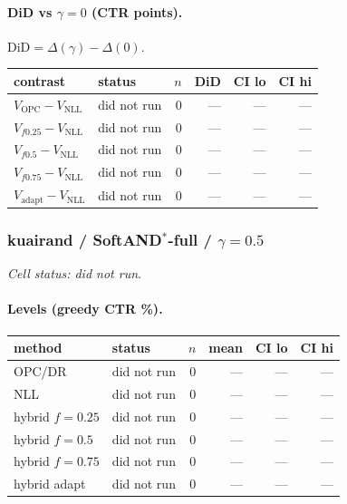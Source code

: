 \documentclass[10pt,a4paper]{article}
\begin{document}
\paragraph{DiD vs $\gamma=0$ (CTR points).} $\mathrm{DiD}=\Delta(\gamma)-\Delta(0)$.
{\centering\small\begin{tabular}{llrrrr}
\toprule contrast & status & $n$ & DiD & CI lo & CI hi \\
\midrule
$V_{\mathrm{OPC}}-V_{\mathrm{NLL}}$ & did not run & 0 & --- & --- & --- \\
$V_{f0.25}-V_{\mathrm{NLL}}$ & did not run & 0 & --- & --- & --- \\
$V_{f0.5}-V_{\mathrm{NLL}}$ & did not run & 0 & --- & --- & --- \\
$V_{f0.75}-V_{\mathrm{NLL}}$ & did not run & 0 & --- & --- & --- \\
$V_{\mathrm{adapt}}-V_{\mathrm{NLL}}$ & did not run & 0 & --- & --- & --- \\
\bottomrule\end{tabular}\par}
\bigskip
\subsubsection{kuairand / SoftAND$^*$-full / $\gamma=0.5$}
\emph{Cell status: did not run}.
\paragraph{Levels (greedy CTR \%).}
{\centering\small\begin{tabular}{llrrrr}
\toprule method & status & $n$ & mean & CI lo & CI hi \\
\midrule
OPC/DR & did not run & 0 & --- & --- & --- \\
NLL & did not run & 0 & --- & --- & --- \\
hybrid $f{=}0.25$ & did not run & 0 & --- & --- & --- \\
hybrid $f{=}0.5$ & did not run & 0 & --- & --- & --- \\
hybrid $f{=}0.75$ & did not run & 0 & --- & --- & --- \\
hybrid adapt & did not run & 0 & --- & --- & --- \\
\bottomrule\end{tabular}\par}
\end{document}
